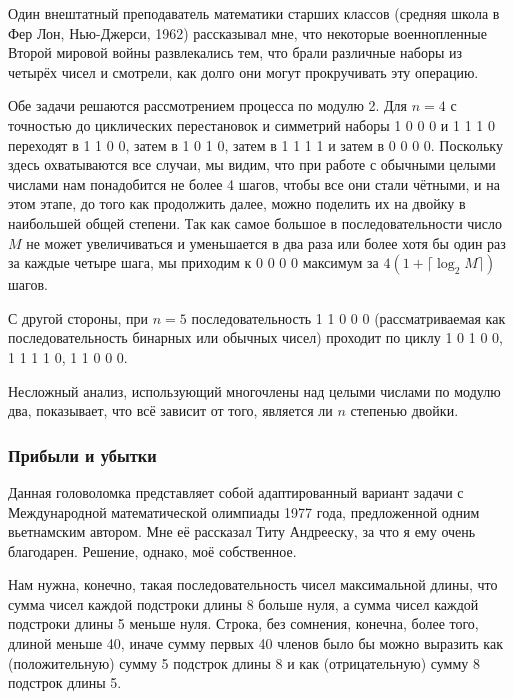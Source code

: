 \documentclass[twoside]{book}
\begin{document}
Один внештатный преподаватель математики старших классов (средняя школа в Фер Лон, Нью-Джерси, 1962)
рассказывал мне,
что некоторые военнопленные Второй мировой войны развлекались тем, что брали различные наборы из четырёх чисел и смотрели, как долго они могут прокручивать эту операцию.

\medskip

Обе задачи решаются рассмотрением процесса по модулю 2.
Для $n=4$ с точностью до циклических перестановок и симметрий наборы
1 0 0 0 
и
1 1 1 0 переходят в
1 1 0 0, затем в
1 0 1 0, затем в
1 1 1 1 и затем в
0 0 0 0.
Поскольку здесь охватываются все случаи, мы видим, что при работе с обычными целыми числами нам понадобится не более 4 шагов, чтобы все они стали чётными, и на этом этапе, до того как продолжить далее, можно поделить их на двойку в наибольшей общей степени.
Так как самое большое в последовательности число~$M$ не может увеличиваться и уменьшается в два раза или более хотя бы один раз за каждые четыре шага, 
мы приходим к 
0 0 0 0 
максимум за $4(1+\lceil\log_2 M\rceil)$ шагов.

С другой стороны, при $n=5$ последовательность 
1 1 0 0 0
(рассматриваемая как последовательность бинарных или обычных чисел)
проходит по циклу 
1 0 1 0 0, 
1 1 1 1 0, 
1 1 0 0 0.\heart 

Несложный анализ, использующий многочлены над целыми числами по модулю два, показывает, что всё зависит от того, является ли $n$ степенью двойки.

\subsubsection*{Прибыли и убытки}%

Данная головоломка представляет собой адаптированный вариант задачи с Международной математической олимпиады 1977 года,
предложенной одним вьетнамским автором.
Мне её рассказал Титу Андрееску, %
за что я ему очень благодарен.
Решение, однако, моё собственное.

\medskip

Нам нужна, конечно, такая последовательность чисел максимальной длины, что сумма чисел каждой подстроки длины 8 больше нуля, а сумма чисел каждой подстроки длины 5 меньше нуля.
Строка, без сомнения, конечна, более того, длиной меньше 40, иначе  сумму первых 40 членов было бы можно выразить как (положительную) сумму 5 подстрок длины 8 и как (отрицательную) сумму 8 подстрок длины 5.
\end{document}
